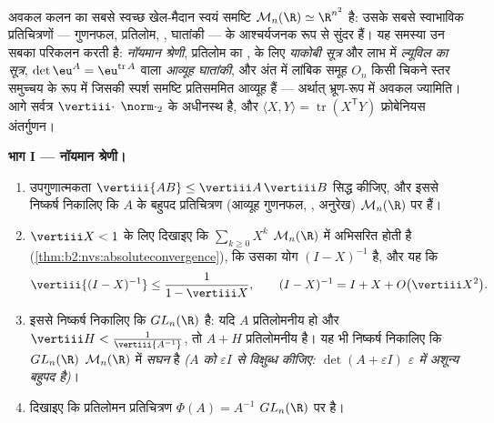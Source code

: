 \begin{problem}\label{pb:b2:diffcalc:1}
अवकल कलन का सबसे स्वच्छ खेल-मैदान स्वयं समष्टि $\mathcal M_n(\R) \simeq \R^{n^2}$ है: उसके सबसे
स्वाभाविक प्रतिचित्रणों --- गुणनफल, प्रतिलोम, , घातांकी --- के 
आश्चर्यजनक रूप से सुंदर हैं। यह समस्या उन सबका परिकलन करती है:
\emph{नॉयमान श्रेणी}, प्रतिलोम का ,  के लिए \emph{याकोबी
सूत्र} और लाभ में \emph{ल्यूविल का सूत्र}, $\det\eu^A = \eu^{\operatorname{tr}A}$ वाला
\emph{आव्यूह घातांकी}, और अंत में लांबिक समूह $O_n$
किसी चिकने स्तर समुच्चय के रूप में जिसकी स्पर्श समष्टि प्रतिसममित आव्यूह
हैं --- अर्थात् भ्रूण-रूप में अवकल ज्यामिति। आगे सर्वत्र $\vertiii\cdot$ $\norm\cdot_2$ के अधीनस्थ
 है, और $\langle X, Y\rangle =
\operatorname{tr}(X^{\mathsf T}Y)$ फ्रोबेनियस अंतर्गुणन।

\medskip
\noindent\textbf{भाग I --- नॉयमान श्रेणी।}
\begin{enumerate}
  \item उपगुणात्मकता $\vertiii{AB} \leq
        \vertiii A\,\vertiii B$ सिद्ध कीजिए, और इससे निष्कर्ष निकालिए कि $A$ के
        बहुपद प्रतिचित्रण (आव्यूह गुणनफल, , अनुरेख) $\mathcal M_n(\R)$ पर 
        हैं।
  \item $\vertiii X < 1$ के लिए दिखाइए कि $\sum_{k\geq0}X^k$ $\mathcal M_n(\R)$ में  अभिसरित होती है
        (\cref{thm:b2:nvs:absoluteconvergence}), कि उसका योग $(I - X)^{-1}$ है, और यह कि
        \[
        \vertiii{(I - X)^{-1}} \leq \frac{1}{1 - \vertiii X},
        \qquad
        (I - X)^{-1} = I + X + O\bigl(\vertiii X^2\bigr) .
        \]
  \item इससे निष्कर्ष निकालिए कि $GL_n(\R)$ \emph{} है: यदि $A$ प्रतिलोमनीय
        हो और $\vertiii H <
        \frac{1}{\vertiii{A^{-1}}}$, तो $A + H$ प्रतिलोमनीय है। यह भी निष्कर्ष निकालिए कि $GL_n(\R)$
        $\mathcal M_n(\R)$ में \emph{सघन} है \emph{($A$ को $\varepsilon I$ से विक्षुब्ध कीजिए:
        $\det(A + \varepsilon I)$ $\varepsilon$ में अशून्य बहुपद है)}।
  \item दिखाइए कि प्रतिलोमन प्रतिचित्रण $\Phi(A) = A^{-1}$ $GL_n(\R)$ पर  है।
\end{enumerate}


\end{problem}
